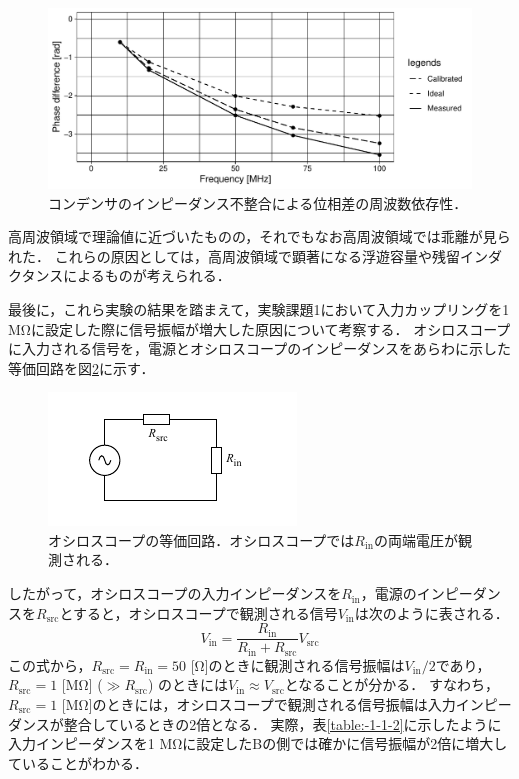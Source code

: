 \documentclass[uplatex,dvipdfmx,a4j,12pt]{jsarticle}
\begin{document}
\begin{figure}[H]
  \centering
  \includegraphics[width=\linewidth]{data/2_2/phase_diff2.pdf}
  \caption{コンデンサのインピーダンス不整合による位相差の周波数依存性．}
  \label{fig:2-6}
\end{figure}

高周波領域で理論値に近づいたものの，それでもなお高周波領域では乖離が見られた．
これらの原因としては，高周波領域で顕著になる浮遊容量や残留インダクタンスによるものが考えられる．

\enskip

最後に，これら実験の結果を踏まえて，実験課題1において入力カップリングを1 \si{\mega \ohm}に設定した際に信号振幅が増大した原因について考察する．
オシロスコープに入力される信号を，電源とオシロスコープのインピーダンスをあらわに示した等価回路を図\ref{fig:osci}に示す．
\begin{figure}[H]
    \centering
    \includegraphics[width=0.5\linewidth]{img/oscilloscope_equiv_circuit.pdf}
    \caption{オシロスコープの等価回路．オシロスコープでは$R_\mathrm{in}$の両端電圧が観測される．}
    \label{fig:osci}
\end{figure}
したがって，オシロスコープの入力インピーダンスを$R_\mathrm{in}$，電源のインピーダンスを$R_\mathrm{src}$とすると，オシロスコープで観測される信号$V_\mathrm{in}$は次のように表される．
\begin{equation}
    V_\mathrm{in} = \frac{R_\mathrm{in}}{R_\mathrm{in} + R_\mathrm{src}}V_\mathrm{src}
\end{equation}
この式から，$R_\mathrm{src} = R_\mathrm{in} = 50$ [\si{\ohm}]のときに観測される信号振幅は$V_\mathrm{in}/2 $であり，
$R_\mathrm{src} = 1$ [\si{\mega \ohm}] ($\gg R_\mathrm{src}$) のときには$V_\mathrm{in} \approx V_\mathrm{src}$となることが分かる．
すなわち，$R_\mathrm{src} = 1$ [\si{\mega \ohm}]のときには，オシロスコープで観測される信号振幅は入力インピーダンスが整合しているときの2倍となる．
実際，表\ref{table:-1-1-2}に示したように入力インピーダンスを1 \si{\mega \ohm}に設定したBの側では確かに信号振幅が2倍に増大していることがわかる．
\end{document}
